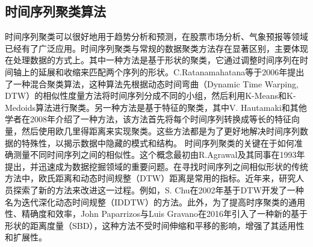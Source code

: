 \subsection{时间序列聚类算法}
时间序列聚类可以很好地用于趋势分析和预测，在股票市场分析、气象预报等领域已经有了广泛应用。时间序列聚类与常规的数据聚类方法存在显著区别，主要体现在处理数据的方式上。其中一种方法是基于形状的聚类，它通过调整时间序列在时间轴上的延展和收缩来匹配两个序列的形状。C.Ratanamahatana等于2006年提出了一种混合聚类算法，这种算法先根据动态时间弯曲（Dynamic Time Warping, DTW）的相似性度量方法将时间序列分成不同的小组，然后利用K-Means和K-Medoids算法进行聚类。另一种方法是基于特征的聚类，其中V. Hautamaki和其他学者在2008年介绍了一种方法，该方法首先将每个时间序列转换成等长的特征向量，然后使用欧几里得距离来实现聚类。这些方法都是为了更好地解决时间序列数据的特殊性，以揭示数据中隐藏的模式和结构。
时间序列聚类的关键在于如何准确测量不同时间序列之间的相似性。这个概念最初由R.Agrawal及其同事在1993年提出，并迅速成为数据挖掘领域的重要问题。在寻找时间序列之间相似形状的传统方法中，欧氏距离和动态时间规整（DTW）距离是常用的指标。近年来，研究人员探索了新的方法来改进这一过程。例如，S. Chu在2002年基于DTW开发了一种名为迭代深化动态时间规整（IDDTW）的方法。此外，为了提高时序聚类的通用性、精确度和效率，John Paparrizos与Luis Gravano在2016年引入了一种新的基于形状的距离度量（SBD），这种方法不受时间伸缩和平移的影响，增强了其适用性和扩展性。
